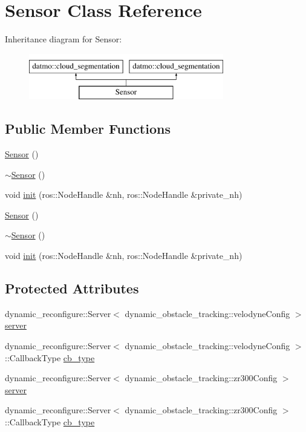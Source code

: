 \hypertarget{classSensor}{}\section{Sensor Class Reference}
\label{classSensor}
Inheritance diagram for Sensor\+:\begin{figure}[H]
\begin{center}
\leavevmode
\includegraphics[height=2.000000cm]{classSensor}
\end{center}
\end{figure}
\subsection*{Public Member Functions}
\begin{DoxyCompactItemize}
\item 
\hyperlink{classSensor_a342d6d11ef572c8cba92cb76fb1a294b}{Sensor} ()
\item 
\hyperlink{classSensor_aee8c70e7ef05ce65e7ee33686b5d7db2}{$\sim$\+Sensor} ()
\item 
void \hyperlink{classSensor_a58bef8bf460ad94b9d95fedd866bcbc4}{init} (ros\+::\+Node\+Handle \&nh, ros\+::\+Node\+Handle \&private\+\_\+nh)
\item 
\hyperlink{classSensor_a342d6d11ef572c8cba92cb76fb1a294b}{Sensor} ()
\item 
\hyperlink{classSensor_aee8c70e7ef05ce65e7ee33686b5d7db2}{$\sim$\+Sensor} ()
\item 
void \hyperlink{classSensor_a58bef8bf460ad94b9d95fedd866bcbc4}{init} (ros\+::\+Node\+Handle \&nh, ros\+::\+Node\+Handle \&private\+\_\+nh)
\end{DoxyCompactItemize}
\subsection*{Protected Attributes}
\begin{DoxyCompactItemize}
\item 
dynamic\+\_\+reconfigure\+::\+Server$<$ dynamic\+\_\+obstacle\+\_\+tracking\+::velodyne\+Config $>$ \hyperlink{classSensor_a3e4e922879e1a2e7921c685b00a2f0d3}{server}
\item 
dynamic\+\_\+reconfigure\+::\+Server$<$ dynamic\+\_\+obstacle\+\_\+tracking\+::velodyne\+Config $>$\+::Callback\+Type \hyperlink{classSensor_af6f13b558862028f47a169529610041d}{cb\+\_\+type}
\item 
dynamic\+\_\+reconfigure\+::\+Server$<$ dynamic\+\_\+obstacle\+\_\+tracking\+::zr300\+Config $>$ \hyperlink{classSensor_ad27e54baddc7c972d5396c9c2f855321}{server}
\item 
dynamic\+\_\+reconfigure\+::\+Server$<$ dynamic\+\_\+obstacle\+\_\+tracking\+::zr300\+Config $>$\+::Callback\+Type \hyperlink{classSensor_afcb79b7b510c2638a22638153094a2b4}{cb\+\_\+type}
\end{DoxyCompactItemize}
